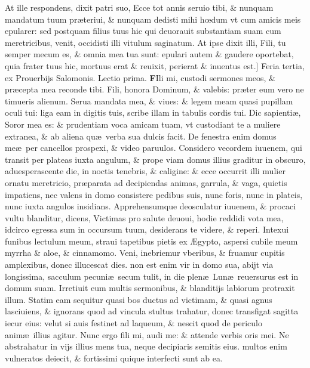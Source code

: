\documentclass[a5paper,10pt]{book}
\def\rightmarginnote{%
	\lrmarginnote{\hskip\columnwidth \hskip -1em}}
\def\ae{æ}
\def\AE{Æ}
\def\oe{œ}
\begin{document}
\begin{multicols*}{2}
At ille respondens, dixit patri suo, Ecce tot annis seruio tibi, \& nunquam mandatum tuum pr\ae teriui, \& nunquam dedisti mihi h\oe dum vt cum amicis meis epularer: sed postquam filius tuus hic qui deuorauit substantiam suam cum meretricibus, venit, occidisti illi vitulum saginatum.
At ipse dixit illi, Fili, tu semper mecum es, \& omnia mea tua sunt: epulari autem \& gaudere oportebat, quia frater tuus hic, mortuus erat \& reuixit, perierat \& inuentus est.]
\newline {} \color{red} \hypertarget{TUE-SECVNDA-POST-ADV}{Feria tertia,} ex Prouerbijs Salomonis. \hfill Lectio prima. \color{black}
\vspace{-.25em}
\lettrine[lines=2]{\bfseries F}{}Ili\rightmarginnote{ca. 7.} mi, custodi sermones meos, \& pr\ae cepta mea reconde tibi.
Fili, honora Dominum, \& valebis: pr\ae ter eum vero ne timueris alienum. %
Serua mandata mea, \& viues: \& legem meam quasi pupillam oculi tui: liga eam in digitis tuis, scribe illam in tabulis cordis tui.
Dic sapienti\ae , Soror mea es: \& prudentiam voca amicam tuam, vt custodiant te a muliere extranea, \& ab aliena qu\ae \ verba sua dulcis facit.
De fenestra enim domus me\ae \ per cancellos prospexi, \& video paruulos. Considero vecordem iuuenem, qui transit per plateas iuxta angulum, \& prope viam domus illius graditur in obscuro, aduesperascente die, in noctis tenebris, \& caligine: \& ecce occurrit illi mulier ornatu meretricio, pr\ae parata ad decipiendas animas, garrula, \& vaga, quietis impatiens, nec valens in domo consistere pedibus suis, nunc foris, nunc in plateis, nunc iuxta angulos insidians.
Apprehensumque deosculatur iuuenem, \& procaci vultu blanditur, dicens, Victimas pro salute deuoui, hodie reddidi vota mea, idcirco egressa sum in occursum
tuum, desiderans te videre, \& reperi.
Intexui funibus lectulum meum, straui tapetibus pietis ex \AE gypto, aspersi cubile meum myrrha \& aloe, \& cinnamomo.
Veni, inebriemur vberibus, \& fruamur cupitis amplexibus, donec illucescat dies. non est enim vir in domo sua, abijt via longissima, sacculum pecuni\ae \ secum tulit, in die plen\ae \ Lun\ae \ reuersurus est in domum suam.
Irretiuit eum multis sermonibus, \& blanditijs labiorum protraxit illum.
Statim eam sequitur quasi bos ductus ad victimam, \& quasi agnus lasciuiens, \& ignorans quod ad vincula stultus trahatur, donec transfigat sagitta iecur eius: velut si auis festinet ad laqueum, \& nescit quod de periculo anim\ae \ illius agitur.
Nunc ergo fili mi, audi me: \& attende verbis oris mei. Ne abstrahatur in vijs illius mens tua, neque decipiaris semitis eius. multos enim vulneratos deiecit, \& fortissimi quique interfecti sunt ab ea.

\end{multicols*}
\end{document}
